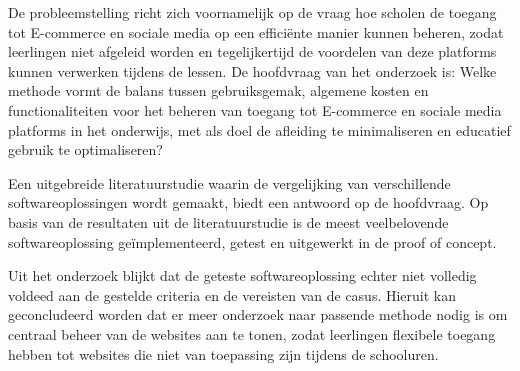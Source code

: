    De probleemstelling richt zich voornamelijk op de vraag hoe scholen de toegang tot E-commerce en sociale media op een efficiënte manier kunnen beheren, zodat leerlingen niet afgeleid worden en tegelijkertijd de voordelen van deze platforms kunnen verwerken tijdens de lessen. De hoofdvraag van het onderzoek is: Welke methode vormt de balans tussen gebruiksgemak, algemene kosten en functionaliteiten voor het beheren van toegang tot E-commerce en sociale media platforms in het onderwijs, met als doel de afleiding te minimaliseren en educatief gebruik te optimaliseren?\newline
   
   Een uitgebreide literatuurstudie waarin de vergelijking van verschillende softwareoplossingen wordt gemaakt, biedt een antwoord op de hoofdvraag. Op basis van de resultaten uit de literatuurstudie is de meest veelbelovende softwareoplossing geïmplementeerd, getest en uitgewerkt in de proof of concept. \newline
   
   Uit het onderzoek blijkt dat de geteste softwareoplossing echter niet volledig voldeed aan de gestelde criteria en de vereisten van de casus. Hieruit kan geconcludeerd worden dat er meer onderzoek naar passende methode nodig is om centraal beheer van de websites aan te tonen, zodat leerlingen flexibele toegang hebben tot websites die niet van toepassing zijn tijdens de schooluren.

   
   
   
   